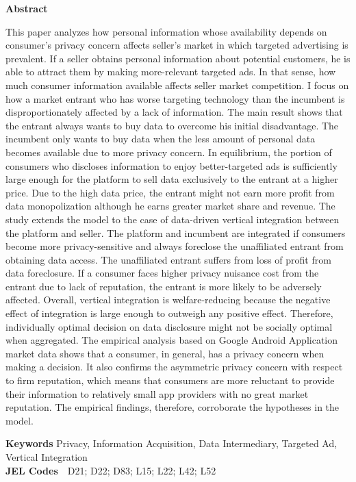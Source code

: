 \documentclass[12pt]{article}
\begin{document}
	\maketitle
	\begin{center}
	 \textbf{Abstract}
	\end{center} \begin{singlespace}
	\footnotesize{This paper analyzes how personal information whose availability depends on consumer's privacy concern affects seller's market in which targeted advertising is prevalent. If a seller obtains personal information about potential customers, he is able to attract them by making more-relevant targeted ads. In that sense, how much consumer information available affects seller market competition. I focus on how a market entrant who has worse targeting technology than the incumbent is disproportionately affected by a lack of information. The main result shows that the entrant always wants to buy data to overcome his initial disadvantage. The incumbent only wants to buy data when the less amount of personal data becomes available due to more privacy concern. In equilibrium, the portion of consumers who discloses information to enjoy better-targeted ads is sufficiently large enough for the platform to sell data exclusively to the entrant at a higher price. Due to the high data price, the entrant might not earn more profit from data monopolization although he earns greater market share and revenue. The study extends the model to the case of data-driven vertical integration between the platform and seller. The platform and incumbent are integrated if consumers become more privacy-sensitive and always foreclose the unaffiliated entrant from obtaining data access. The unaffiliated entrant suffers from loss of profit from data foreclosure. If a consumer faces higher privacy nuisance cost from the entrant due to lack of reputation, the entrant is more likely to be adversely affected. Overall, vertical integration is welfare-reducing because the negative effect of integration is large enough to outweigh any positive effect. Therefore, individually optimal decision on data disclosure might not be socially optimal when aggregated. The empirical analysis based on Google Android Application market data shows that a consumer, in general, has a privacy concern when making a decision. It also confirms the asymmetric privacy concern with respect to firm reputation, which means that consumers are more reluctant to provide their information to relatively small app providers with no great market reputation. The empirical findings, therefore, corroborate the hypotheses in the model.

}
		
\end{singlespace}
\bigskip
\begin{small}\textbf{Keywords} \quad Privacy, Information Acquisition, Data Intermediary, Targeted Ad,  Vertical Integration \\
\textbf{JEL Codes} \,\, D21; D22; D83; L15; L22; L42; L52\end{small}
\end{document}

